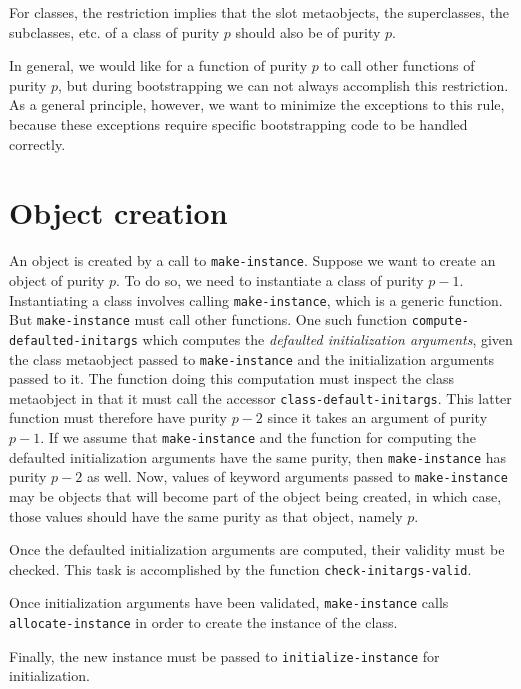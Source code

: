 For classes, the restriction implies that the slot metaobjects, the
superclasses, the subclasses, etc. of a class of purity $p$ should
also be of purity $p$.

In general, we would like for a function of purity $p$ to call other
functions of purity $p$, but during bootstrapping we can not always
accomplish this restriction.  As a general principle, however, we want
to minimize the exceptions to this rule, because these exceptions
require specific bootstrapping code to be handled correctly.

\section{Object creation}
\label{sec-app-bootstrapping-object-allocation}

An object is created by a call to \texttt{make-instance}.
Suppose we want to create an object of purity $p$.  To do so, we
need to instantiate a class of purity $p-1$.  Instantiating a class
involves calling \texttt{make-instance}, which is a generic
function.  But \texttt{make-instance} must call other functions.  One
such function \texttt{compute-defaulted-initargs} which
computes the \emph{defaulted initialization arguments},
given the class metaobject passed to \texttt{make-instance} and the
initialization arguments passed to it.  The function doing this
computation must inspect the class metaobject in that it must call the
accessor \texttt{class-default-initargs}.  This latter function must
therefore have purity $p-2$ since it takes an argument of purity
$p-1$.  If we assume that \texttt{make-instance} and the function for
computing the defaulted initialization arguments have the same purity,
then \texttt{make-instance} has purity $p-2$ as well.  Now, values of
keyword arguments passed to \texttt{make-instance} may be objects that
will become part of the object being created, in which case, those
values should have the same purity as that object, namely $p$.

Once the defaulted initialization arguments are computed, their
validity must be checked.  This task is accomplished by the function
\texttt{check-initargs-valid}.

Once initialization arguments have been validated,
\texttt{make-instance} calls \texttt{allocate-instance} in order to
create the instance of the class.

Finally, the new instance must be passed to
\texttt{initialize-instance} for initialization.


